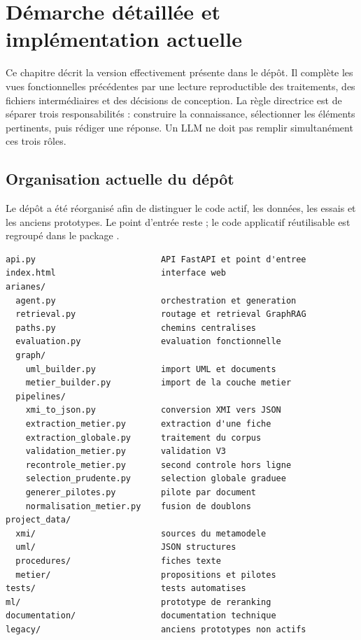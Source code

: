 \chapter{Démarche détaillée et implémentation actuelle}

Ce chapitre décrit la version effectivement présente dans le dépôt. Il complète les vues
fonctionnelles précédentes par une lecture reproductible des traitements, des fichiers
intermédiaires et des décisions de conception. La règle directrice est de séparer trois
responsabilités : construire la connaissance, sélectionner les éléments pertinents, puis
rédiger une réponse. Un LLM ne doit pas remplir simultanément ces trois rôles.

\section{Organisation actuelle du dépôt}

Le dépôt a été réorganisé afin de distinguer le code actif, les données, les essais et les
anciens prototypes. Le point d'entrée reste ; le code applicatif réutilisable
est regroupé dans le package .

\begin{lstlisting}[caption={Arborescence fonctionnelle actuelle}]
api.py                         API FastAPI et point d'entree
index.html                     interface web
arianes/
  agent.py                     orchestration et generation
  retrieval.py                 routage et retrieval GraphRAG
  paths.py                     chemins centralises
  evaluation.py                evaluation fonctionnelle
  graph/
    uml_builder.py             import UML et documents
    metier_builder.py          import de la couche metier
  pipelines/
    xmi_to_json.py             conversion XMI vers JSON
    extraction_metier.py       extraction d'une fiche
    extraction_globale.py      traitement du corpus
    validation_metier.py       validation V3
    recontrole_metier.py       second controle hors ligne
    selection_prudente.py      selection globale graduee
    generer_pilotes.py         pilote par document
    normalisation_metier.py    fusion de doublons
project_data/
  xmi/                         sources du metamodele
  uml/                         JSON structures
  procedures/                  fiches texte
  metier/                      propositions et pilotes
tests/                         tests automatises
ml/                            prototype de reranking
documentation/                 documentation technique
legacy/                        anciens prototypes non actifs
\end{lstlisting}

